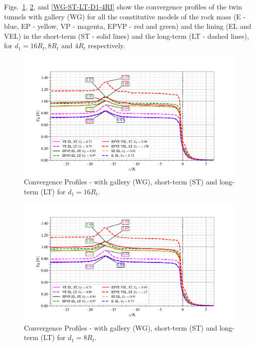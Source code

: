 \documentclass[a4paper,fleqn]{cas-sc}
\begin{document}
Figs.~\ref{WG-ST-LT-D1-16RI}, \ref{WG-ST-LT-D1-8RI}, and \ref{WG-ST-LT-D1-4RI} show the convergence profiles of the twin tunnels with gallery (WG) for all the constitutive models of the rock mass (E - blue, EP - yellow, VP - magenta, EPVP - red and green) and the lining (EL and VEL) in the short-term (ST - solid lines) and the long-term (LT - dashed lines), for $d_1 = 16R_t, 8R_t$ and $4R_t$ respectively.
\begin{figure}[h!]
	\centering
	\includegraphics[scale=0.9]{Convergence Profiles - WG_ST_LT - $d_1=16R_i$_anotate.pdf}
	\caption{Convergence Profiles - with gallery (WG), short-term (ST) and long-term (LT) for $d_1 = 16R_t$.}
	\label{WG-ST-LT-D1-16RI}
\end{figure}
\FloatBarrier
\begin{figure}[h!]
	\centering
	\includegraphics[scale=0.9]{Convergence Profiles - WG_ST_LT - $d_1=8R_i$_anotate.pdf}
	\caption{Convergence Profiles - with gallery (WG), short-term (ST) and long-term (LT) for $d_1 = 8R_t$.}
	\label{WG-ST-LT-D1-8RI}
\end{figure}
\FloatBarrier
\end{document}
